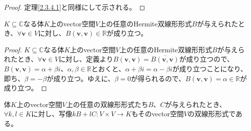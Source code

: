 \documentclass[dvipdfmx]{jsarticle}
\begin{document}
\begin{proof}
定理\ref{2.3.4.1}と同様にして示される。
\end{proof}
\begin{thm}\label{2.3.4.3}
$K \subseteq \mathbb{C}$なる体$K$上のvector空間$V$上の任意のHermite双線形形式$B$が与えられたとき、$\forall\mathbf{v} \in V$に対し、$B\left( \mathbf{v},\mathbf{v} \right) \in \mathbb{R}$が成り立つ。
\end{thm}
\begin{proof}
$K \subseteq \mathbb{C}$なる体$K$上のvector空間$V$上の任意のHermite双線形形式$B$が与えられたとき、$\forall\mathbf{v} \in V$に対し、定義より$B\left( \mathbf{v},\mathbf{v} \right) = \overline{B\left( \mathbf{v},\mathbf{v} \right)}$が成り立つので、$B\left( \mathbf{v},\mathbf{v} \right) = \alpha + \beta i$、$\alpha,\beta \in \mathbb{R}$とおくと、$\alpha + \beta i = \alpha - \beta i$が成り立つことになり、即ち、$\beta = - \beta$が成り立つ。ゆえに、$\beta = 0$が得られるので、$B\left( \mathbf{v},\mathbf{v} \right) = \alpha \in \mathbb{R}$が成り立つ。
\end{proof}
\begin{thm}\label{2.3.4.4}
体$K$上のvector空間$V$上の任意の双線形形式たち$B$、$C$が与えられたとき、$\forall k,l \in K$に対し、写像$kB + lC:V \times V \rightarrow K$もそのvector空間$V$の双線形形式である。
\end{thm}
\end{document}
